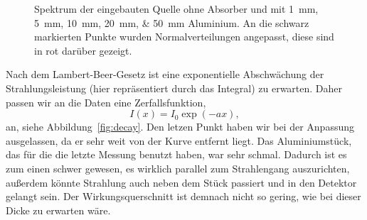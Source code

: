 \documentclass[11pt, ngerman, fleqn, DIV=15, headinclude, BCOR=2cm]{scrreprt}
\begin{document}
\begin{figure}[htbp]
    \centering
    \caption{%
        Spektrum der eingebauten Quelle ohne Absorber und mit
        \SIlist{1;5;10;20;50}{\milli\meter} Aluminium. An die schwarz
        markierten Punkte wurden Normalverteilungen angepasst, diese sind in
        rot darüber gezeigt.
    }
    \label{fig:amplituden}
\end{figure}

Nach dem Lambert-Beer-Gesetz ist eine exponentielle Abschwächung der
Strahlungsleistung (hier repräsentiert durch das Integral) zu erwarten. Daher
passen wir an die Daten eine Zerfallsfunktion,
\[
    I(x) = I_0 \exp(- a x),
\]
an, siehe Abbildung~\ref{fig:decay}. Den letzen Punkt haben wir bei der
Anpassung ausgelassen, da er sehr weit von der Kurve entfernt liegt. Das
Aluminiumstück, das für die die letzte Messung benutzt haben, war sehr schmal.
Dadurch ist es zum einen schwer gewesen, es wirklich parallel zum Strahlengang
auszurichten, außerdem könnte Strahlung auch neben dem Stück passiert und in
den Detektor gelangt sein. Der Wirkungsquerschnitt ist demnach nicht so gering,
wie bei dieser Dicke zu erwarten wäre.
\end{document}

